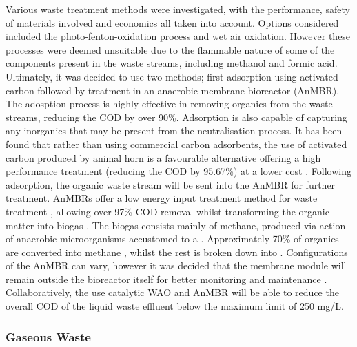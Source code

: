 Various waste treatment methods were investigated, with the performance,  safety of materials involved and economics all taken into account. Options considered included the photo-fenton-oxidation process and wet air oxidation. However these processes were deemed unsuitable due to the flammable nature of some of the components present in the waste streams, including methanol and formic acid. Ultimately, it was decided to use two methods; first adsorption using activated carbon followed by treatment in an anaerobic membrane bioreactor (AnMBR). The adosption process is highly effective in removing organics from the waste streams, reducing the COD by over 90\%. Adsorption is also capable of capturing any inorganics that may be present from the neutralisation process. It has been found that rather than using commercial carbon adsorbents, the use of activated carbon produced by animal horn is a favourable alternative offering a high performance treatment (reducing the COD by 95.67\%) at a lower cost \cite{aluyor_cod_2008}. Following adsorption, the organic waste stream will be sent into the AnMBR for further treatment. AnMBRs offer a low energy input treatment method for waste treatment \cite{maaz_anaerobic_2019}, allowing over 97\% COD removal whilst transforming the organic matter into biogas \cite{ariunbaatar_performance_2021}. The biogas consists mainly of methane, produced via action of anaerobic microorganisms accustomed to a  . Approximately 70\% of organics are converted into methane \cite{ariunbaatar_performance_2021}, whilst the rest is broken down into . Configurations of the AnMBR can vary, however it was decided that the membrane module will remain outside the bioreactor itself for better monitoring and maintenance \cite{maaz_anaerobic_2019}. Collaboratively, the use catalytic WAO and AnMBR will be able to reduce the overall COD of the liquid waste effluent below the maximum limit of 250 mg/L. 


\subsubsection{Gaseous Waste}

